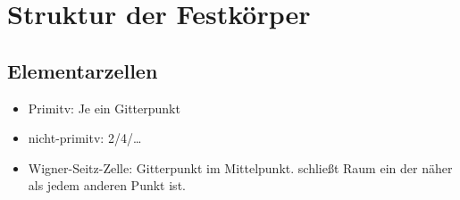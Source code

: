 \section{Struktur der Festkörper}

\subsection*{Elementarzellen}
\begin{itemize}
    \item Primitv: Je ein Gitterpunkt
    \item nicht-primitv: 2/4/\dots
    \item Wigner-Seitz-Zelle: Gitterpunkt im Mittelpunkt. schließt Raum ein der näher als jedem anderen Punkt ist.
\end{itemize}


